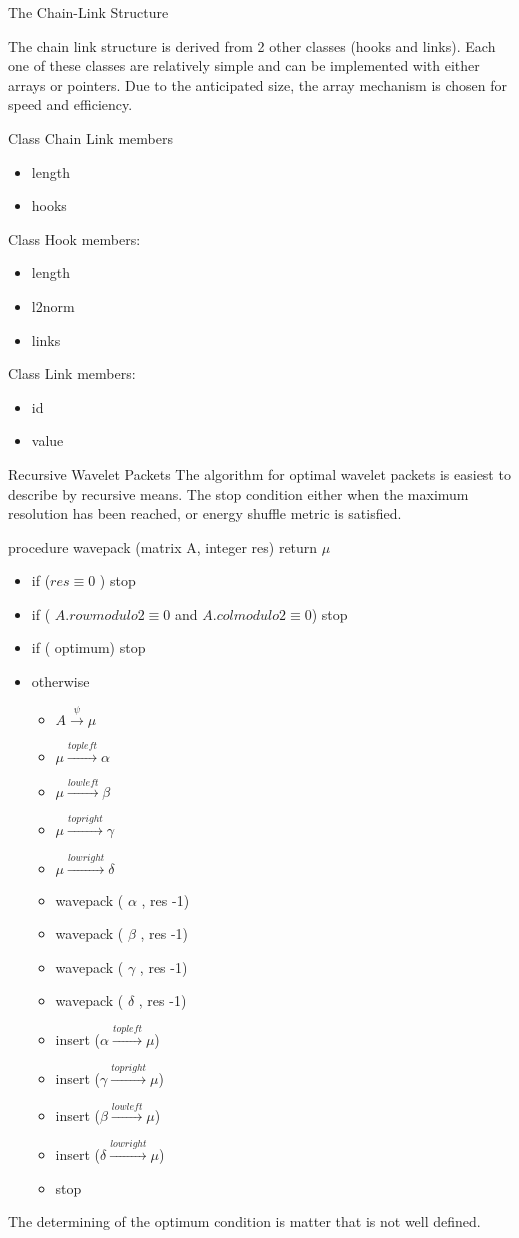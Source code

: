 \documentclass[11pt]{article}
\begin{document}
The Chain-Link Structure

The chain link structure is derived from 2 other classes (hooks and links).   Each one of these classes are relatively simple and can be implemented with either arrays or pointers.  Due to the anticipated size, the array mechanism is chosen for speed and efficiency.  

Class Chain Link members
\begin{itemize}
\item length 
\item hooks
\end{itemize}

Class Hook 
members:
\begin{itemize}
\item length
\item l2norm
\item links 
\end{itemize}



Class Link
members: 
\begin{itemize}
\item id
\item value
\end{itemize}


Recursive Wavelet Packets
The algorithm for optimal wavelet packets is easiest to describe by recursive means.  The stop condition either when the maximum resolution has been reached, or energy shuffle metric is satisfied.  

procedure wavepack (matrix A, integer res) return $\mu$
\begin{itemize}
\item if ($res \equiv 0$  ) stop
\item if ( $A.row {modulo} 2 \equiv  0$ and $A.col {modulo} 2 \equiv 0$) stop
\item if ( optimum) stop
\item otherwise 
\begin{itemize}
\item $A \stackrel{\psi}{\to} \mu $
\item $\mu \stackrel{topleft}{\to} \alpha$
\item $\mu \stackrel{lowleft}{\to} \beta$
\item $\mu \stackrel{topright}{\to} \gamma$
\item $\mu \stackrel{lowright}{\to} \delta$
\item wavepack ( $\alpha$ , res -1)
\item wavepack ( $\beta$ , res -1)
\item wavepack ( $\gamma$ , res -1)
\item wavepack ( $\delta$ , res -1)
\item insert ($\alpha  \stackrel{topleft}{\to} \mu$)
\item insert ($\gamma  \stackrel{topright}{\to} \mu$)
\item insert ($\beta  \stackrel{lowleft}{\to} \mu$)
\item insert ($\delta  \stackrel{lowright}{\to} \mu$)
\item stop
\end{itemize}

\end{itemize}

The determining of the optimum condition is matter that is not well defined. 


 
\end{document}
